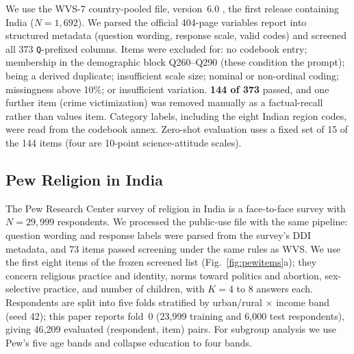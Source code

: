\documentclass[conference]{IEEEtran}
\begin{document}
We use the WVS-7 country-pooled file, version~6.0 \cite{wvs7}, the first release containing India ($N=1{,}692$). We parsed the official 404-page variables report into structured metadata (question wording, response scale, valid codes) and screened all 373 \texttt{Q}-prefixed columns. Items were excluded for: no codebook entry; membership in the demographic block Q260--Q290 (these condition the prompt); being a derived duplicate; insufficient scale size; nominal or non-ordinal coding; missingness above 10\%; or insufficient variation. \textbf{144 of 373} passed, and one further item (crime victimization) was removed manually as a factual-recall rather than values item. Category labels, including the eight Indian region codes, were read from the codebook annex. Zero-shot evaluation uses a fixed set of 15 of the 144 items (four are 10-point science-attitude scales).

\subsection{Pew Religion in India}

The Pew Research Center survey of religion in India \cite{pew2021} is a face-to-face survey with $N=29{,}999$ respondents. We processed the public-use file with the same pipeline: question wording and response labels were parsed from the survey's DDI metadata, and 73 items passed screening under the same rules as WVS. We use the first eight items of the frozen screened list (Fig.~\ref{fig:pewitems}a); they concern religious practice and identity, norms toward politics and abortion, sex-selective practice, and number of children, with $K=4$ to 8 answers each. Respondents are split into five folds stratified by urban/rural $\times$ income band (seed 42); this paper reports fold~0 (23{,}999 training and 6{,}000 test respondents), giving 46{,}209 evaluated (respondent, item) pairs. For subgroup analysis we use Pew's five age bands and collapse education to four bands.
\end{document}
